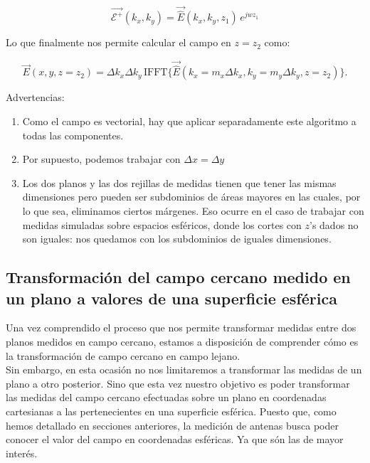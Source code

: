 \documentclass{article}
\begin{document}
\begin{equation}
\vec{\mathcal{E}^{+}}(k_{x},k_{y})=\vec{\hat{E}}(k_{x},k_{y},z_{1})\,e^{j
w z_{1}}
\end{equation}

Lo que finalmente nos permite calcular el campo en $z=z_2$ como:

\begin{equation}
\vec{E}(x,y,z=z_{2})=\Delta k_{x} \Delta
k_{y}\,\mbox{IFFT}\{\vec{\hat{E}}(k_{x}=m_{x}\Delta
k_{x},k_{y}=m_{y} \Delta k_{y},z=z_{2})\}.
\end{equation}

Advertencias:
\begin{enumerate}
\item Como el campo es vectorial, hay que aplicar separadamente este
algoritmo a todas las componentes.
\item Por supuesto, podemos trabajar con $\Delta x=\Delta y$
\item Los dos planos y las dos rejillas de medidas tienen que tener las mismas
dimensiones pero pueden ser subdominios de áreas mayores en las
cuales, por lo que sea, eliminamos ciertos márgenes. Eso ocurre en
el caso de trabajar con medidas simuladas sobre espacios esféricos,
donde los cortes con $z$'s dados no son iguales: nos quedamos con
los subdominios de iguales dimensiones.
\end{enumerate}

\newpage

\subsection{Transformación del campo cercano medido en un plano a valores de una superficie esférica}

Una vez comprendido el proceso que nos permite transformar medidas entre dos planos medidos en campo cercano, estamos a disposición de comprender cómo es la transformación de campo cercano en campo lejano.\\

Sin embargo, en esta ocasión no nos limitaremos a transformar las medidas de un plano a otro posterior. Sino que esta vez nuestro objetivo es poder transformar las medidas del campo cercano efectuadas sobre un plano en coordenadas cartesianas a las pertenecientes en una superficie esférica. Puesto que, como hemos detallado en secciones anteriores, la medición de antenas busca poder conocer el valor del campo en coordenadas esféricas. Ya que són las de mayor interés.
\\
\end{document}
